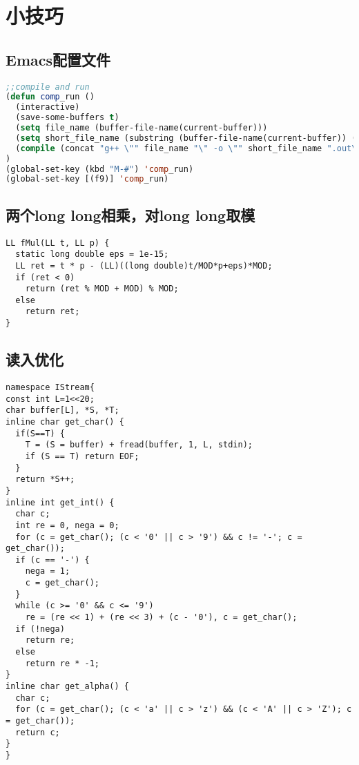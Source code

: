 \section{小技巧}

\subsection{Emacs配置文件}
\begin{lstlisting}[language=Lisp]
;;compile and run
(defun comp_run ()
  (interactive)
  (save-some-buffers t)
  (setq file_name (buffer-file-name(current-buffer)))
  (setq short_file_name (substring (buffer-file-name(current-buffer)) (string-match "[^/]*$" file_name) (string-match "[.][A-Za-z]*$" file_name)))
  (compile (concat "g++ \"" file_name "\" -o \"" short_file_name ".out\" -lm -DQWERTIER -g --std=gnu++11 -Wall && ./" short_file_name ".out"))
)
(global-set-key (kbd "M-#") 'comp_run)
(global-set-key [(f9)] 'comp_run)
\end{lstlisting}

\subsection{两个long long相乘，对long long取模}
\begin{lstlisting}
LL fMul(LL t, LL p) {
  static long double eps = 1e-15;
  LL ret = t * p - (LL)((long double)t/MOD*p+eps)*MOD;
  if (ret < 0)
    return (ret % MOD + MOD) % MOD;
  else
    return ret;
}
\end{lstlisting}
\subsection{读入优化}
\begin{lstlisting}
namespace IStream{  
const int L=1<<20;
char buffer[L], *S, *T;
inline char get_char() {
  if(S==T) {
    T = (S = buffer) + fread(buffer, 1, L, stdin);
    if (S == T) return EOF;
  }
  return *S++;
}
inline int get_int() {
  char c;
  int re = 0, nega = 0;
  for (c = get_char(); (c < '0' || c > '9') && c != '-'; c = get_char());
  if (c == '-') {
    nega = 1;
    c = get_char();
  }
  while (c >= '0' && c <= '9')
    re = (re << 1) + (re << 3) + (c - '0'), c = get_char();
  if (!nega)
    return re;
  else
    return re * -1;
}
inline char get_alpha() {
  char c;
  for (c = get_char(); (c < 'a' || c > 'z') && (c < 'A' || c > 'Z'); c = get_char());
  return c;
}
}
\end{lstlisting}
